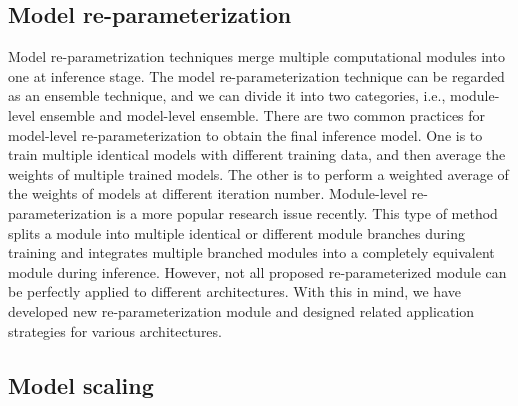 \documentclass[10pt,twocolumn,letterpaper]{article}
\begin{document}
		\subsection{Model re-parameterization}
		
		Model re-parametrization techniques \cite{szegedy2016rethinking, huang2017snapshot, tarvainen2017mean, garipov2018loss, izmailov2018averaging, ding2019acnet, cao2020ensemble, guo2020expandnets, ding2021repvgg, ding2021diverse, ding2022re, hu2022online, ding2022scaling, vasu2022improved} merge multiple computational modules into one at inference stage. The model re-parameterization technique can be regarded as an ensemble technique, and we can divide it into two categories, i.e., module-level ensemble and model-level ensemble. There are two common practices for model-level re-parameterization to obtain the final inference model. One is to train multiple identical models with different training data, and then average the weights of multiple trained models.  The other is to perform a weighted average of the weights of models at different iteration number. Module-level re-parameterization is a more popular research issue recently. This type of method splits a module into multiple identical or different module branches during training and integrates multiple branched modules into a completely equivalent module during inference. However, not all proposed re-parameterized module can be perfectly applied to different architectures. With this in mind, we have developed new re-parameterization module and designed related application strategies for various architectures.
		
		\subsection{Model scaling}
		
\end{document}
